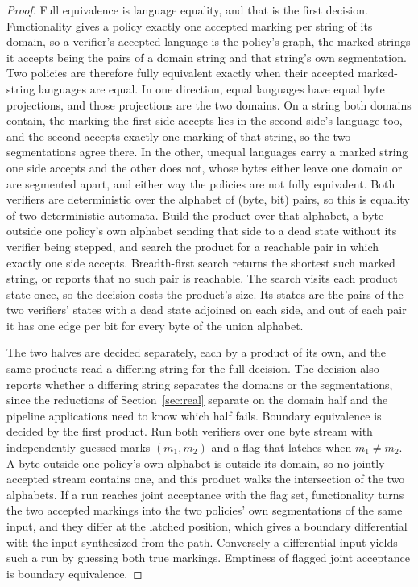 \documentclass[11pt,a4paper]{article}
\theoremstyle{definition}
\theoremstyle{plain}
\begin{document}
\begin{proof}
Full equivalence is language equality, and that is the first decision. Functionality gives a policy exactly one accepted
marking per string of its domain, so a verifier's accepted language is the policy's graph, the marked strings it accepts
being the pairs of a domain string and that string's own segmentation. Two policies are therefore fully equivalent
exactly when their accepted marked-string languages are equal. In one direction, equal languages have equal byte
projections, and those projections are the two domains. On a string both domains contain, the marking the first side
accepts lies in the second side's language too, and the second accepts exactly one marking of that string, so the two
segmentations agree there. In the other, unequal languages carry a marked string one side accepts and the other does
not, whose bytes either leave one domain or are segmented apart, and either way the policies are not fully equivalent.
Both verifiers are deterministic over the alphabet of (byte, bit) pairs, so this is equality of two deterministic
automata. Build the product over that alphabet, a byte outside one policy's own alphabet sending that side to a dead
state without its verifier being stepped, and search the product for a reachable pair in which exactly one side accepts.
Breadth-first search returns the shortest such marked string, or reports that no such pair is reachable. The search
visits each product state once, so the decision costs the product's size. Its states are the pairs of the two verifiers'
states with a dead state adjoined on each side, and out of each pair it has one edge per bit for every byte of the union
alphabet.

The two halves are decided separately, each by a product of its own, and the same products read a differing string for
the full decision. The decision also reports whether a differing string separates the domains or the segmentations,
since the reductions of Section~\ref{sec:real} separate on the domain half and the pipeline applications need to know
which half fails. Boundary equivalence is decided by the first product. Run both verifiers over one byte stream with
independently guessed marks $(m_1, m_2)$ and a flag that latches when $m_1 \neq m_2$. A byte outside one policy's own
alphabet is outside its domain, so no jointly accepted stream contains one, and this product walks the intersection of
the two alphabets. If a run reaches joint acceptance with the flag set, functionality turns the two accepted markings
into the two policies' own segmentations of the same input, and they differ at the latched position, which gives a
boundary differential with the input synthesized from the path. Conversely a differential input yields such a run by
guessing both true markings. Emptiness of flagged joint acceptance is boundary equivalence.


\end{proof}
\end{document}
